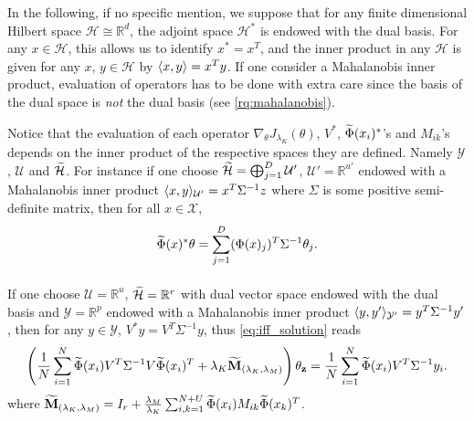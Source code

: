 In the following, if no specific mention, we suppose that for any finite dimensional Hilbert space $\mathcal{H}\cong\mathbb{R}^d$, the adjoint space $\mathcal{H}^*$ is endowed with the dual basis. For any $x\in\mathcal{H}$, this allows us to identify $x^*=x^T$, and the inner product in any $\mathcal{H}$ is given for any $x$, $y\in\mathcal{H}$ by $\langle x,y\rangle=x^Ty$. If one consider a Mahalanobis inner product, evaluation of operators has to be done with extra care since the basis of the dual space is \emph{not} the dual basis (see \cref{rq:mahalanobis}).
\begin{remark}
\label{rq:mahalanobis}
Notice that the evaluation of each operator $\nabla_{\theta} J_{\lambda_K}(\theta)$, $V^*$, $\widetilde{\Phi}(x_i)^*$'s and $M_{ik}$'s depends on the inner product of the respective spaces they are defined. Namely $\mathcal{Y}$, $\mathcal{U}$ and $\widetilde{\mathcal{H}}$. For instance if one choose $\widetilde{\mathcal{H}}=\operatorname{\bigoplus}_{j=1}^D \mathcal{U}'$, $\mathcal{U}'=\mathbb{R}^{u'}$ endowed with a Mahalanobis inner product $\langle x,y\rangle_{\mathcal{U}'}=x^T\Sigma^{-1} z$ where $\Sigma$ is some positive semi-definite matrix, then for all $x\in\mathcal{X}$,
\begin{dmath*}
\tildePhi{\omega}(x)^*\theta=\sum_{j=1}^D(\Phi(x)_j)^T \Sigma^{-1}\theta_j.
\end{dmath*}
\paragraph{}
If one choose $\mathcal{U}=\mathbb{R}^u$, $\widetilde{\mathcal{H}}=\mathbb{R}^{r}$ with dual vector space endowed with the dual basis and $\mathcal{Y}=\mathbb{R}^p$ endowed with a Mahalanobis inner product $\langle y,y'\rangle_{\mathcal{Y}'}=y^T\Sigma^{-1} y'$, then for any $y\in\mathcal{Y}$, $V^*y=V^T\Sigma^{-1}y$, thus \cref{eq:iff_solution} reads
\begin{dmath*}
\left(\frac{1}{N}\sum_{i=1}^N \tildePhi{\omega}(x_i)V^T \Sigma^{-1}V\tildePhi{\omega}(x_i)^T + \lambda_K\mathbf{\widetilde{M}}_{\left(\lambda_K,\lambda_M\right)}\right)\theta_{\seq{z}} = \frac{1}{N}\sum_{i=1}^N \tildePhi{\omega}(x_i)V^T \Sigma^{-1} y_i.
\end{dmath*}
where $\mathbf{\widetilde{M}}_{\left(\lambda_K,\lambda_M\right)}=I_{r} + \frac{\lambda_M}{\lambda_K}\sum_{i,k=1}^{N+U}\widetilde{\Phi}(x_i)M_{ik}\widetilde{\Phi}(x_k)^T$.
\end{remark}

